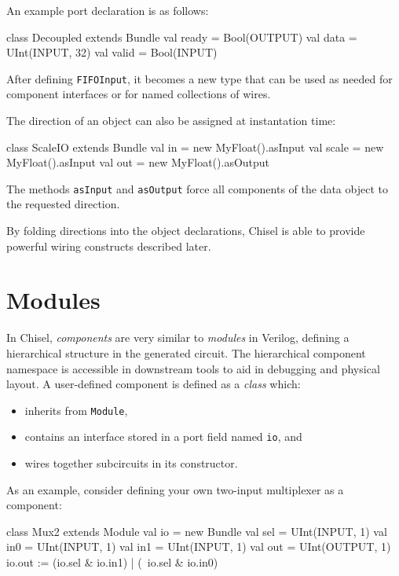 \documentclass[twocolumn,10pt]{article}
\def\code#1{{\tt #1}}
\begin{document}
An example port declaration is as follows:
\begin{scala}
class Decoupled extends Bundle {
  val ready = Bool(OUTPUT)
  val data  = UInt(INPUT, 32)
  val valid = Bool(INPUT)
}
\end{scala}

\noindent
After defining \code{FIFOInput}, it becomes a new type that can be
used as needed for component interfaces or for named collections of
wires.

The direction of an object can also be assigned at instantation time:
\begin{scala}
class ScaleIO extends Bundle {
  val in    = new MyFloat().asInput
  val scale = new MyFloat().asInput
  val out   = new MyFloat().asOutput
}
\end{scala}

\noindent
The methods \code{asInput} and \code{asOutput} force all components of
the data object to the requested direction.

By folding directions into the object declarations, Chisel is able to
provide powerful wiring constructs described later.



\section{Modules}

In Chisel, {\em components} are very similar to {\em modules} in
Verilog, defining a hierarchical structure in the generated circuit.
The hierarchical component namespace is accessible in downstream tools
to aid in debugging and physical layout.  A user-defined component is
defined as a {\em class} which:
\begin{itemize}
\item inherits from \code{Module},
\item contains an interface stored in a port field named \code{io}, and
\item wires together subcircuits in its constructor.
\end{itemize}
As an example, consider defining your own two-input multiplexer as a
component:
\begin{scala}
class Mux2 extends Module {
  val io = new Bundle{
    val sel = UInt(INPUT, 1)
    val in0 = UInt(INPUT, 1)
    val in1 = UInt(INPUT, 1)
    val out = UInt(OUTPUT, 1)
  }
  io.out := (io.sel & io.in1) | (~io.sel & io.in0)
}
\end{scala}
\end{document}
